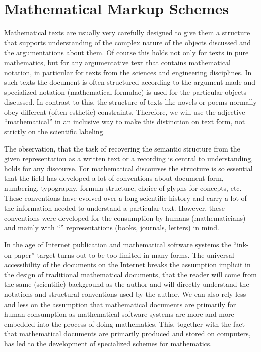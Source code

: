 \chapter{Mathematical Markup Schemes}\label{chap:markup}

Mathematical texts are usually very carefully designed to give them a structure
that supports understanding of the complex nature of the objects discussed and the
argumentations about them.  Of course this holds not only for texts in pure
mathematics, but for any argumentative text that contains mathematical notation,
in particular for texts from the sciences and engineering disciplines. In such
texts the document is often structured according to the argument made and
specialized notation (mathematical formulae) is used for the particular objects
discussed.  In contrast to this, the structure of texts like novels or poems
normally obey different (often esthetic) constraints. Therefore, we will use the
adjective ``mathematical'' in an inclusive way to make this distinction on text
form, not strictly on the scientific labeling.

The observation, that the task of recovering the semantic structure from the given
representation as a written text or a recording is central to understanding, holds
for any discourse. For mathematical discourses the structure is so essential that
the field has developed a lot of conventions about document form, numbering,
typography, formula structure, choice of glyphs for concepts, etc.  These
conventions have evolved over a long scientific history and carry a lot of the
information needed to understand a particular text. However, these conventions
were developed for the consumption by humans (mathematicians) and mainly with
``{}'' representations (books, journals, letters) in mind.

In the age of Internet publication and mathematical software systems the
``ink-on-paper'' target turns out to be too limited in many forms. The universal
accessibility of the documents on the Internet breaks the assumption implicit in
the design of traditional mathematical documents, that the reader will come from
the same (scientific) background as the author and will directly understand the
notations and structural conventions used by the author.  We can also rely less
and less on the assumption that mathematical documents are primarily for human
consumption as mathematical software systems are more and more embedded into the
process of doing mathematics. This, together with the fact that mathematical
documents are primarily produced and stored on computers, has led to the
development of specialized {} schemes for mathematics.

